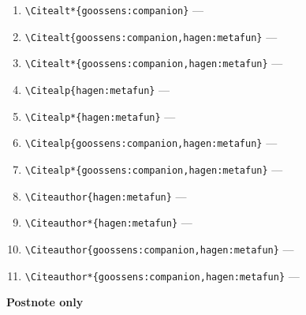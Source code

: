 \documentclass[12pt]{article}
\begin{document}
\begin{enumerate}
\item
\verb|\Citealt*{goossens:companion}| ---  
\item
\verb|\Citealt{goossens:companion,hagen:metafun}| ---  
\item
\verb|\Citealt*{goossens:companion,hagen:metafun}| ---  
\item
\verb|\Citealp{hagen:metafun}| ---  
\item
\verb|\Citealp*{hagen:metafun}| ---  
\item
\verb|\Citealp{goossens:companion,hagen:metafun}| ---  
\item
\verb|\Citealp*{goossens:companion,hagen:metafun}| ---  
\item
\verb|\Citeauthor{hagen:metafun}| ---  
\item
\verb|\Citeauthor*{hagen:metafun}| ---  
\item
\verb|\Citeauthor{goossens:companion,hagen:metafun}| ---  
\item
\verb|\Citeauthor*{goossens:companion,hagen:metafun}| ---  
\end{enumerate}

\textbf{Postnote only}
\end{document}
